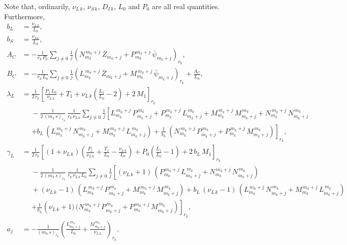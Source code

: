 \documentclass[12pt,prb,aps]{revtex4-1}
\begin{document}
Note that, ordinarily, $\nu_{L\,k}$, $\nu_{S\,k}$, $D_{I\,k}$, $L_0$ and $P_0$ are all real quantities. 
Furthermore, 
\begin{align}
b_{L} &= \frac{\nu_{L\,k}}{L_0},\label{ebl}\\[0.5ex]
b_{S} &= \frac{\nu_{S\,k}}{L_0},\label{ebs}\\[0.5ex]
A_{C} &= - \frac{1}{r_k\,P_0}\sum_{j\neq 0}\frac{1}{j}\left(N_{m_k}^{\,m_k+j}\,\bar{Z}_{m_k+j}+ P_{m_k}^{\,m_k+j}\,\bar{\psi}_{m_k+j}\right)_{r_k},\\[0.5ex]
B_{C} &= - \frac{1}{r_k\,L_0}\sum_{j\neq 0}\frac{1}{j}\left(L_{m_k}^{\,m_k+j}\,\bar{Z}_{m_k+j}+ M_{m_k}^{\,m_k+j}\,\bar{\psi}_{m_k+j}\right)_{r_k}+\frac{A_{C}}{L_0},\\[0.5ex]
\lambda_{L} &= \frac{1}{2\,r_k}\left[\frac{P_1\,L_0}{\nu_{L\,k}} + T_1 + \nu_{L\,k}\left(\frac{L_1}{L_0}-2\right)+2\,M_1\right]_{r_k}\nonumber\\[0.5ex]&
\phantom{=}-\frac{1}{2\,(m_k\,s)_{r_k}}\,\frac{1}{r_k\,\nu_{L\,k}}\sum_{j\neq0}\frac{1}{j}\left[L_{m_k}^{\,m_k+j}\,P_{m_k+j}^{\,m_k}+P_{m_k}^{\,m_k+j}\,L_{m_k+j}^{\,m_k} +
M_{m_k}^{\,m_k+j}\,M_{m_k+j}^{\,m_k}+N_{m_k}^{\,m_k+j}\,N_{m_k+j}^{\,m_k}\phantom{\frac{a}{b_L}}\right.\nonumber\\[0.5ex]&
\phantom{=}\left. + b_{L}\,(L_{m_k}^{\,{m_k}+j}\,N_{m_k+j}^{\,m_k}+M_{m_k}^{\,m_k+j}\,L_{m_k+j}^{\,m_k})+\frac{1}{b_{L}}\,(N_{m_k}^{\,m_k+j}\,P_{m_k+j}^{\,m_k}+ P_{m_k}^{\,m_k+j}\,M_{m_k+j}^{\,m_k})\right]_{r_k},\\[0.5ex]
\gamma_{L} &=\frac{1}{2\,r_k}\left[(1+\nu_{L\,k})\left(\frac{P_1}{\nu_{L\,k}}+\frac{T_1}{L_0}-\frac{\nu_{L\,k}}{L_0}\right)+
P_0\left(\frac{L_1}{L_0}-1\right)+2\,b_{L}\,M_1\right]_{r_k}\nonumber\\[0.5ex]
&\phantom{=}-\frac{1}{2\,(m_k\,s)_{r_k}}\,\frac{1}{r_k\,\nu_{L\,k}\,L_0}\sum_{j\neq 0}\frac{1}{j}\left[(\nu_{L\,k}+1)\,(P_{m_k}^{\,m_k+j}\,L_{m_k+j}^{\,m_k}+N_{m_k}^{\,m_k+j}\,N_{m_k+j}^{\,m_k})\phantom{\frac{a}{b_L}}\right.\nonumber\\[0.5ex]
&\phantom{=} +(\nu_{L\,k}-1)\,(L_{m_k}^{\,m_k+j}\,P_{m_k+j}^{\,m_k}+M_{m_k}^{\,m_k+j}\,M_{m_k+j}^{\,m_k})+b_{L}\,(\nu_{L\,k}-1)\,(L_{m_k}^{\,m_k+j}\,N_{m_k+j}^{\,m_k}+M_{m_k}^{\,m_k+j}\,L_{m_k+j}^{\,m_k}) \nonumber\\[0.5ex]
&\phantom{=} \left. + \frac{1}{b_{L}}\left(\nu_{L\,k}+1)\,(N_{m_k}^{\,m_k+j}\,P_{m_k+j}^{\,m_k}+P_{m_k}^{\,m_k+j}\,M_{m_k+j}^{\,m_k}\right)\right]_{r_k},\\[0.5ex]
a_j&=-\frac{1}{(m_k\,s)_{r_k}}\left(\frac{L^{\,m_k}_{m_k+j}}{L_0}+\frac{M^{\,m_k}_{m_k+j}}{\nu_{L\,k}}\right)_{r_k},\label{e135}\\[0.5ex]

\end{align}
\end{document}
